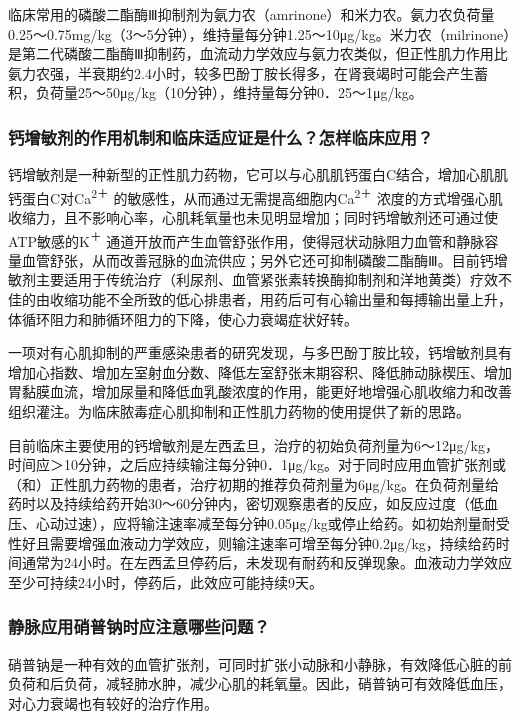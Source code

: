 临床常用的磷酸二酯酶Ⅲ抑制剂为氨力农（amrinone）和米力农。氨力农负荷量0.25～0.75mg/kg（3～5分钟），维持量每分钟1.25～10μg/kg。米力农（milrinone）是第二代磷酸二酯酶Ⅲ抑制药，血流动力学效应与氨力农类似，但正性肌力作用比氨力农强，半衰期约2.4小时，较多巴酚丁胺长得多，在肾衰竭时可能会产生蓄积，负荷量25～50μg/kg（10分钟），维持量每分钟0．25～1μg/kg。

\subsubsection{钙增敏剂的作用机制和临床适应证是什么？怎样临床应用？}

钙增敏剂是一种新型的正性肌力药物，它可以与心肌肌钙蛋白C结合，增加心肌肌钙蛋白C对Ca\textsuperscript{2＋}
的敏感性，从而通过无需提高细胞内Ca\textsuperscript{2＋}
浓度的方式增强心肌收缩力，且不影响心率，心肌耗氧量也未见明显增加；同时钙增敏剂还可通过使ATP敏感的K\textsuperscript{＋}
通道开放而产生血管舒张作用，使得冠状动脉阻力血管和静脉容量血管舒张，从而改善冠脉的血流供应；另外它还可抑制磷酸二酯酶Ⅲ。目前钙增敏剂主要适用于传统治疗（利尿剂、血管紧张素转换酶抑制剂和洋地黄类）疗效不佳的由收缩功能不全所致的低心排患者，用药后可有心输出量和每搏输出量上升，体循环阻力和肺循环阻力的下降，使心力衰竭症状好转。

一项对有心肌抑制的严重感染患者的研究发现，与多巴酚丁胺比较，钙增敏剂具有增加心指数、增加左室射血分数、降低左室舒张末期容积、降低肺动脉楔压、增加胃黏膜血流，增加尿量和降低血乳酸浓度的作用，能更好地增强心肌收缩力和改善组织灌注。为临床脓毒症心肌抑制和正性肌力药物的使用提供了新的思路。

目前临床主要使用的钙增敏剂是左西孟旦，治疗的初始负荷剂量为6～12μg/kg，时间应＞10分钟，之后应持续输注每分钟0．1μg/kg。对于同时应用血管扩张剂或（和）正性肌力药物的患者，治疗初期的推荐负荷剂量为6μg/kg。在负荷剂量给药时以及持续给药开始30～60分钟内，密切观察患者的反应，如反应过度（低血压、心动过速），应将输注速率减至每分钟0.05μg/kg或停止给药。如初始剂量耐受性好且需要增强血液动力学效应，则输注速率可增至每分钟0.2μg/kg，持续给药时间通常为24小时。在左西孟旦停药后，未发现有耐药和反弹现象。血液动力学效应至少可持续24小时，停药后，此效应可能持续9天。

\subsubsection{静脉应用硝普钠时应注意哪些问题？}

硝普钠是一种有效的血管扩张剂，可同时扩张小动脉和小静脉，有效降低心脏的前负荷和后负荷，减轻肺水肿，减少心肌的耗氧量。因此，硝普钠可有效降低血压，对心力衰竭也有较好的治疗作用。

